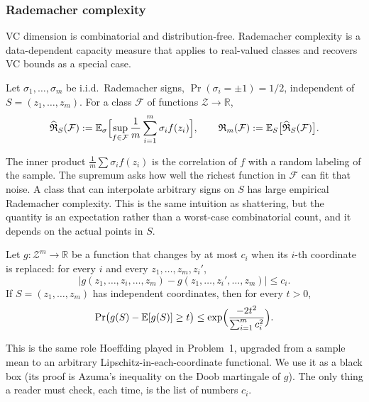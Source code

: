 \subsubsection{Rademacher complexity}
\label{subsubsec:mlu-rad}

VC dimension is combinatorial and distribution-free. Rademacher complexity is a data-dependent capacity measure that applies to real-valued classes and recovers VC bounds as a special case.

\begin{definition}
\label{def:mlu-rad}
Let $\sigma_1,\dots,\sigma_m$ be i.i.d.\ Rademacher signs, $\Pr(\sigma_i=\pm 1)=1/2$, independent of $S=(z_1,\dots,z_m)$. For a class $\mathcal{F}$ of functions $\mathcal{Z}\to\mathbb{R}$,
\[
\widehat{\mathfrak{R}}_S(\mathcal{F})
:=
\mathbb{E}_{\sigma}
\Bigl[
\sup_{f\in\mathcal{F}}
\frac1m\sum_{i=1}^m\sigma_i f(z_i)
\Bigr],
\qquad
\mathfrak{R}_m(\mathcal{F})
:=
\mathbb{E}_S\bigl[\widehat{\mathfrak{R}}_S(\mathcal{F})\bigr].
\]
\end{definition}

\begin{remark}
The inner product $\frac1m\sum\sigma_i f(z_i)$ is the correlation of $f$ with a random labeling of the sample. The supremum asks how well the richest function in $\mathcal{F}$ can fit that noise. A class that can interpolate arbitrary signs on $S$ has large empirical Rademacher complexity. This is the same intuition as shattering, but the quantity is an expectation rather than a worst-case combinatorial count, and it depends on the actual points in $S$.
\end{remark}

\begin{lemma}
\label{lem:mlu-mcdiarmid}
Let $g:\mathcal{Z}^m\to\mathbb{R}$ be a function that changes by at most $c_i$ when its $i$-th coordinate is replaced: for every $i$ and every $z_1,\dots,z_m,z_i'$,
\[
\bigl\lvert g(z_1,\dots,z_i,\dots,z_m)-g(z_1,\dots,z_i',\dots,z_m)\bigr\rvert
\le
c_i.
\]
If $S=(z_1,\dots,z_m)$ has independent coordinates, then for every $t>0$,
\[
\Pr\bigl(g(S)-\mathbb{E}[g(S)]\ge t\bigr)
\le
\exp\Bigl(\frac{-2t^2}{\sum_{i=1}^m c_i^2}\Bigr).
\]
\end{lemma}

\begin{remark}
This is the same role Hoeffding played in Problem~1, upgraded from a sample mean to an arbitrary Lipschitz-in-each-coordinate functional. We use it as a black box (its proof is Azuma's inequality on the Doob martingale of $g$). The only thing a reader must check, each time, is the list of numbers $c_i$.
\end{remark}

